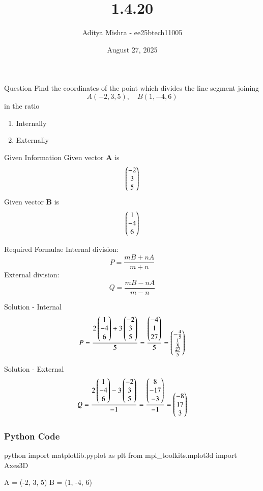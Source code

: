 \documentclass{beamer}
\title{1.4.20}
\date{August 27, 2025}
\author{Aditya Mishra - ee25btech11005}
\begin{document}
\frame{\titlepage}

\begin{frame}{Question}
Find the coordinates of the point which divides the line segment joining
\[
A(-2,3,5), \quad B(1,-4,6)
\]
in the ratio
\begin{enumerate}
  \item Internally
  \item Externally
\end{enumerate}
\end{frame}

\begin{frame}{Given Information}
Given vector $\mathbf{A}$ is
\[
\begin{pmatrix}-2 \\ 3 \\ 5\end{pmatrix}
\]
Given vector $\mathbf{B}$ is
\[
\begin{pmatrix}1 \\ -4 \\ 6\end{pmatrix}
\]
\end{frame}

\begin{frame}{Required Formulae}
Internal division:
\[
P = \frac{mB+nA}{m+n}
\]
External division:
\[
Q = \frac{mB-nA}{m-n}
\]
\end{frame}

\begin{frame}{Solution - Internal}
\[
P = \frac{2\begin{pmatrix}1 \\ -4 \\ 6\end{pmatrix}+3\begin{pmatrix}-2 \\ 3 \\ 5\end{pmatrix}}{5}
= \frac{\begin{pmatrix}-4 \\ 1 \\ 27\end{pmatrix}}{5}
= \begin{pmatrix}-\tfrac{4}{5} \\ \tfrac{1}{5} \\ \tfrac{27}{5}\end{pmatrix}
\]
\end{frame}

\begin{frame}{Solution - External}
\[
Q = \frac{2\begin{pmatrix}1 \\ -4 \\ 6\end{pmatrix}-3\begin{pmatrix}-2 \\ 3 \\ 5\end{pmatrix}}{-1}
= \frac{\begin{pmatrix}8 \\ -17 \\ -3\end{pmatrix}}{-1}
= \begin{pmatrix}-8 \\ 17 \\ 3\end{pmatrix}
\]
\end{frame}


\begin{frame}[fragile]
\frametitle{Python Code}
\begin{mintedbox}{python}
import matplotlib.pyplot as plt
from mpl_toolkits.mplot3d import Axes3D

A = (-2, 3, 5)
B = (1, -4, 6)
\end{mintedbox}
\end{frame}
\end{document}
